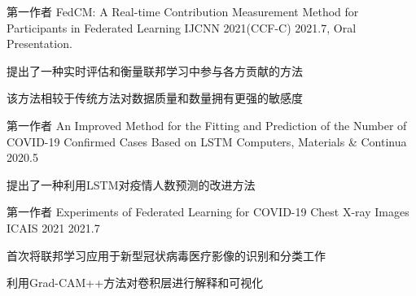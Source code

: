 

\begin{cventries}
    \cventry
    {第一作者} %
    {FedCM: A Real-time Contribution Measurement Method for Participants in Federated Learning} %
    {IJCNN 2021(CCF-C)} %
    {2021.7, Oral Presentation.} %
    {
        \begin{cvitems} %
            \item {提出了一种实时评估和衡量联邦学习中参与各方贡献的方法}
            \item {该方法相较于传统方法对数据质量和数量拥有更强的敏感度}
        \end{cvitems}
    }

    \cventry
    {第一作者} %
    {An Improved Method for the Fitting and Prediction of the Number of COVID-19 Confirmed Cases Based on LSTM} %
    {Computers, Materials \& Continua} %
    {2020.5} %
    {
        \begin{cvitems} %
            \item {提出了一种利用LSTM对疫情人数预测的改进方法}
        \end{cvitems}
    }

    \cventry
    {第一作者} %
    {Experiments of Federated Learning for COVID-19 Chest X-ray Images} %
    {ICAIS 2021} %
    {2021.7} %
    {
        \begin{cvitems} %
            \item {首次将联邦学习应用于新型冠状病毒医疗影像的识别和分类工作}
            \item {利用Grad-CAM++方法对卷积层进行解释和可视化}
        \end{cvitems}
    }

\end{cventries}
